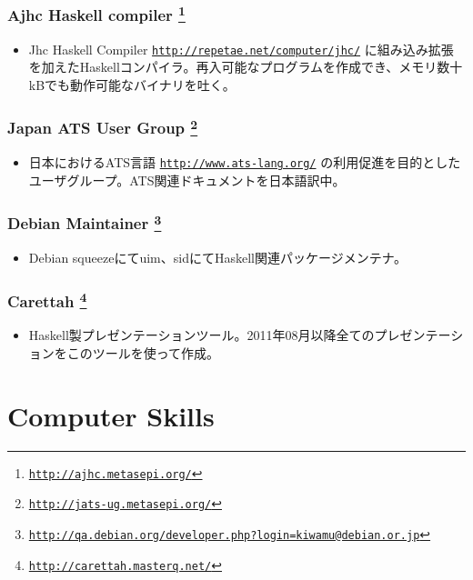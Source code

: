 \documentclass[letterpaper]{article}
\begin{document}
\subsubsection*{Ajhc Haskell compiler \footnote{\href{http://ajhc.metasepi.org/}{\tt http://ajhc.metasepi.org/}}}
\begin{itemize}
\item Jhc Haskell Compiler \href{http://repetae.net/computer/jhc/}{\tt http://repetae.net/computer/jhc/} に組み込み拡張を加えたHaskellコンパイラ。再入可能なプログラムを作成でき、メモリ数十kBでも動作可能なバイナリを吐く。
\end{itemize}

\subsubsection*{Japan ATS User Group \footnote{\href{http://jats-ug.metasepi.org/}{\tt http://jats-ug.metasepi.org/}}}
\begin{itemize}
\item 日本におけるATS言語 \href{http://www.ats-lang.org/}{\tt http://www.ats-lang.org/} の利用促進を目的としたユーザグループ。ATS関連ドキュメントを日本語訳中。
\end{itemize}

\subsubsection*{Debian Maintainer \footnote{\href{http://qa.debian.org/developer.php?login=kiwamu@debian.or.jp}{\tt http://qa.debian.org/developer.php?login=kiwamu@debian.or.jp}}}
\begin{itemize}
\item Debian squeezeにてuim、sidにてHaskell関連パッケージメンテナ。
\end{itemize}

\subsubsection*{Carettah \footnote{\href{http://carettah.masterq.net/}{\tt http://carettah.masterq.net/}}}
\begin{itemize}
\item Haskell製プレゼンテーションツール。2011年08月以降全てのプレゼンテーションをこのツールを使って作成。
\end{itemize}

\section*{Computer Skills}
\end{document}
